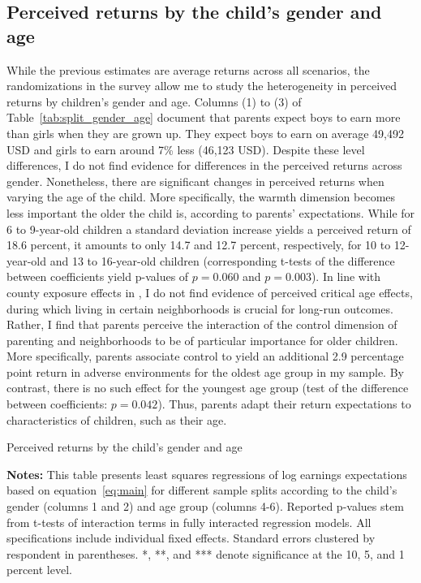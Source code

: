 \documentclass[12pt, a4paper, english]{article}
\begin{document}
\subsection{Perceived returns by the child's gender and age}\label{sec:gender_age_randomization}
While the previous estimates are average returns across all scenarios, the randomizations in the survey allow me to study the heterogeneity in perceived returns by children's gender and age. Columns (1) to (3) of Table~\ref{tab:split_gender_age} document that parents expect boys to earn more than girls when they are grown up. They expect boys to earn on average 49,492 USD and girls to earn around 7\% less (46,123 USD). Despite these level differences, I do not find evidence for differences in the perceived returns across gender. Nonetheless, there are significant changes in perceived returns when varying the age of the child. More specifically, the warmth dimension becomes less important the older the child is, according to parents' expectations. While for 6 to 9-year-old children a standard deviation increase yields a perceived return of 18.6 percent, it amounts to only 14.7 and 12.7 percent, respectively, for 10 to 12-year-old and 13 to 16-year-old children (corresponding t-tests of the difference between coefficients yield p-values of $p=0.060$ and $p=0.003$). In line with county exposure effects in \citet{ChettyHendren2018Exposure}, I do not find evidence of perceived critical age effects, during which living in certain neighborhoods is crucial for long-run outcomes. Rather, I find that parents perceive the interaction of the control dimension of parenting and neighborhoods to be of particular importance for older children. More specifically, parents associate control to yield an additional 2.9 percentage point return in adverse environments for the oldest age group in my sample. By contrast, there is no such effect for the youngest age group (test of the difference between coefficients: $p=0.042$). Thus, parents adapt their return expectations to characteristics of children, such as their age.

\begin{sidewaystable}
  \caption{Perceived returns by the child's gender and age}\label{tab:split_gender_age}
  \resizebox{0.95\textwidth}{!}{
        
  }
  \vspace{0.5em}
  \caption*{\footnotesize \textbf{Notes:} This table presents least squares regressions of log earnings expectations based on equation~\eqref{eq:main} for different sample splits according to the child's gender (columns 1 and 2) and age group (columns 4-6). Reported p-values stem from t-tests of interaction terms in fully interacted regression models. All specifications include individual fixed effects. Standard errors clustered by respondent in parentheses. *, **, and *** denote significance at the 10, 5, and 1 percent level.}
\end{sidewaystable}
\end{document}

